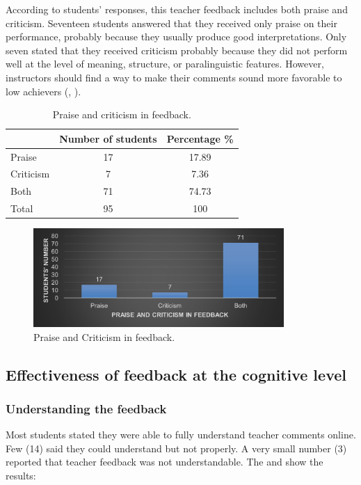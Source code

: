 \documentclass[english]{textolivre}
\begin{document}
According to students’ responses, this teacher feedback includes both praise and criticism. Seventeen students answered that they received only praise on their performance, probably because they usually produce good interpretations. Only seven stated that they received criticism probably because they did not perform well at the level of meaning, structure, or paralinguistic features. However, instructors should find a way to make their comments sound more favorable to low achievers (, ).

\begin{table}[h!]
\centering
\begin{threeparttable}
\caption{Praise and criticism in feedback.}
\label{tbl3}
\centering
\begin{tabular}{p{} c c}
\toprule
 & Number of students & Percentage \% \\ \midrule
Praise & 17 & 17.89  \\ 
Criticism & 7 & 7.36 \\
Both & 71 & 74.73 \\
Total & 95 & 100 \\
\bottomrule
\end{tabular}
\end{threeparttable}
\end{table}

\begin{figure}[h!]
 \centering
 \begin{minipage}{.85\textwidth}
 \includegraphics[width=0.85\textwidth]{03.jpg}
 \caption{Praise and Criticism in feedback.}
 \label{fig03}
 \end{minipage}
\end{figure}

\subsection{Effectiveness of feedback at the cognitive level}

\subsubsection{Understanding the feedback}
Most students stated they were able to fully understand teacher comments online. Few (14) said they could understand but not properly. A very small number (3) reported that teacher feedback was not understandable. The  and  show the results:
\end{document}
